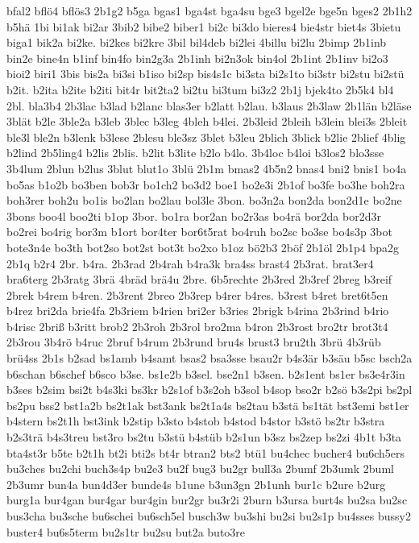 {bfal2
bflö4
bflös3
2b1g2
b5ga
bgas1
bga4st
bga4su
bge3
bgel2e
bge5n
bges2
2b1h2
b5hä
1bi
bi1ak
bi2ar
3bib2
bibe2
biber1
bi2c
bi3do
bieres4
bie4str
biet4s
3bietu
biga1
bik2a
bi2ke.
bi2kes
bi2kre
3bil
bil4deb
bi2lei
4billu
bi2lu
2bimp
2b1inb
bin2e
bine4n
b1inf
bin4fo
bin2g3a
2b1inh
bi2n3ok
bin4ol
2b1int
2b1inv
bi2o3
bioi2
biri1
3bis
bis2a
bi3si
b1iso
bi2sp
bis4s1c
bi3sta
bi2s1to
bi3str
bi2stu
bi2stü
b2it.
b2ita
b2ite
b2iti
bit4r
bit2ta2
bi2tu
bi3tum
bi3z2
2b1j
bjek4to
2b5k4
bl4
2bl.
bla3b4
2b3lac
b3lad
b2lanc
blas3er
b2latt
b2lau.
b3laus
2b3law
2b1län
b2läse
3blät
b2le
3ble2a
b3leb
3blec
b3leg
4bleh
b4lei.
2b3leid
2bleih
b3lein
blei3s
2bleit
ble3l
ble2n
b3lenk
b3lese
2blesu
ble3sz
3blet
b3leu
2blich
3blick
b2lie
2blief
4blig
b2lind
2b5ling4
b2lis
2blis.
b2lit
b3lite
b2lo
b4lo.
3b4loc
b4loi
b3los2
blo3sse
3b4lum
2blun
b2lus
3blut
blut1o
3blü
2b1m
bmas2
4b5n2
bnas4
bni2
bnis1
bo4a
bo5as
b1o2b
bo3ben
bob3r
bo1ch2
bo3d2
boe1
bo2e3i
2b1of
bo3fe
bo3he
boh2ra
boh3rer
boh2u
bo1is
bo2lan
bo2lau
bol3le
3bon.
bo3n2a
bon2da
bon2d1e
bo2ne
3bons
boo4l
boo2ti
b1op
3bor.
bo1ra
bor2an
bo2r3as
bo4rä
bor2da
bor2d3r
bo2rei
bo4rig
bor3m
b1ort
bor4ter
bor6t5rat
bo4ruh
bo2sc
bo3se
bo4s3p
3bot
bote3n4e
bo3th
bot2so
bot2st
bot3t
bo2xo
b1oz
bö2b3
2böf
2b1öl
2b1p4
bpa2g
2b1q
b2r4
2br.
b4ra.
2b3rad
2b4rah
b4ra3k
bra4ss
brast4
2b3rat.
brat3er4
bra6terg
2b3ratg
3brä
4bräd
brä4u
2bre.
6b5rechte
2b3red
2b3ref
2breg
b3reif
2brek
b4rem
b4ren.
2b3rent
2breo
2b3rep
b4rer
b4res.
b3rest
b4ret
bret6t5en
b4rez
bri2da
brie4fa
2b3riem
b4rien
bri2er
b3ries
2brigk
b4rina
2b3rind
b4rio
b4risc
2briß
b3ritt
brob2
2b3roh
2b3rol
bro2ma
b4ron
2b3rost
bro2tr
brot3t4
2b3rou
3b4rö
b4ruc
2bruf
b4rum
2b3rund
bru4s
brust3
bru2th
3brü
4b3rüb
brü4ss
2b1s
b2sad
bs1amb
b4samt
bsas2
bsa3sse
bsau2r
b4s3är
b3säu
b5sc
bsch2a
b6schan
b6schef
b6sco
b3se.
bs1e2b
b3sel.
bse2n1
b3sen.
b2s1ent
bs1er
bs3e4r3in
b3ses
b2sim
bsi2t
b4s3ki
bs3kr
b2s1of
b3s2oh
b3sol
b4sop
bso2r
b2sö
b3s2pi
bs2pl
bs2pu
bss2
bst1a2b
bs2t1ak
bst3ank
bs2t1a4s
bs2tau
b3stä
bs1tät
bst3emi
bst1er
b4stern
bs2t1h
bst3ink
b2stip
b3sto
b4stob
b4stod
b4stor
b3stö
bs2tr
b3stra
b2s3trä
b4s3treu
bst3ro
bs2tu
b3stü
b4stüb
b2s1un
b3sz
bs2zep
bs2zi
4b1t
b3ta
bta4st3r
b5te
b2t1h
bt2i
bti2s
bt4r
btran2
bts2
btü1
bu4chec
bucher4
bu6ch5ers
bu3ches
bu2chi
buch3s4p
bu2e3
bu2f
bug3
bu2gr
bull3a
2bumf
2b3umk
2buml
2b3umr
bun4a
bun4d3er
bunde4s
b1une
b3un3gn
2b1unh
bur1c
b2ure
b2urg
burg1a
bur4gan
bur4gar
bur4gin
bur2gr
bu3r2i
2burn
b3ursa
burt4s
bu2sa
bu2sc
bus3cha
bu3sche
bu6schei
bu6sch5el
busch3w
bu3shi
bu2si
bu2s1p
bu4sses
bussy2
buster4
bu6s5term
bu2s1tr
bu2su
but2a
buto3re
}
